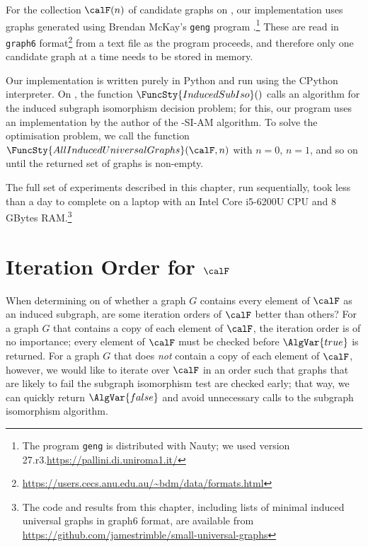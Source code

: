 For the collection $\calF(n)$ of candidate graphs on , our
implementation uses graphs generated using Brendan McKay's \texttt{geng}
program \citep{DBLP:journals/jal/McKay98}.\footnote{The program \texttt{geng} is distributed
with Nauty; we used version 27.r3.\url{https://pallini.di.uniroma1.it/}}
These are read in \texttt{graph6}
format\footnote{\url{https://users.cecs.anu.edu.au/~bdm/data/formats.html}}
from a text file as the program proceeds, and therefore only one candidate
graph at a time needs to be stored in memory.

Our implementation is written purely in Python and run using the CPython
interpreter.
On , the function $\FuncSty{InducedSubIso}()$
calls an algorithm for the induced
subgraph isomorphism decision problem; for this,
our program uses an implementation by the author of the \McSplit-SI-AM
algorithm.
To solve the optimisation problem, we call
the function $\FuncSty{AllInducedUniversalGraphs}(\calF,n)$
with $n=0$, $n=1$, and so on until the returned set of graphs is non-empty.

The full set of experiments described in this chapter, run sequentially,
took less than a day to complete on a laptop with an Intel Core i5-6200U CPU
and 8 GBytes RAM.\footnote{The code and
results from this chapter, including lists of minimal induced universal graphs
in graph6 format, are available from
\url{https://github.com/jamestrimble/small-universal-graphs}}

\section{Iteration Order for $\calF$}\label{sec:iteration-order}

When determining on  of  whether a graph $G$ contains
every element of $\calF$ as an induced subgraph, are some iteration orders of
$\calF$ better than others?  For a graph $G$ that contains a copy of each
element of $\calF$, the iteration order is of no importance;
every element of $\calF$ must be checked before $\AlgVar{true}$ is returned.
For a graph $G$ that
does \emph{not} contain a copy of each element of $\calF$, however, we would like
to iterate over $\calF$ in an order such that graphs that are likely to fail the
subgraph isomorphism test are checked early; that way, we can quickly return
$\AlgVar{false}$ and avoid unnecessary calls to the subgraph isomorphism algorithm.

